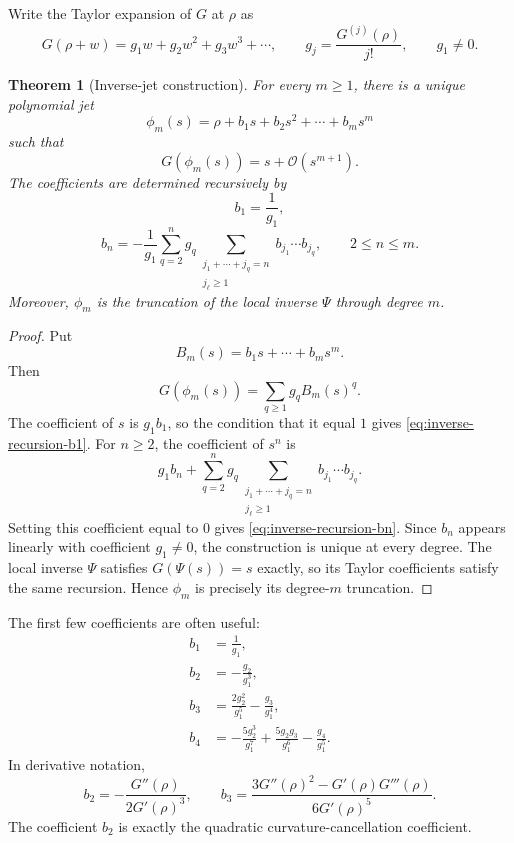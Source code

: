 \documentclass[11pt]{article}
\newtheorem{theorem}{Theorem}[section]
\theoremstyle{definition}
\newcommand{\Oterm}{\mathcal{O}}
\begin{document}
Write the Taylor expansion of $G$ at $\rho$ as
\begin{equation}\label{eq:G-taylor}
G(\rho+w)=g_1w+g_2w^2+g_3w^3+\cdots,
\qquad
g_j=\frac{G^{(j)}(\rho)}{j!},
\qquad g_1\neq0.
\end{equation}

\begin{theorem}[Inverse-jet construction]\label{thm:inverse-jet}
For every $m\geq1$, there is a unique polynomial jet
\begin{equation}\label{eq:phi-m-jet}
\phi_m(s)=\rho+b_1s+b_2s^2+\cdots+b_ms^m
\end{equation}
such that
\begin{equation}\label{eq:inverse-jet-flatness}
G(\phi_m(s))=s+\Oterm(s^{m+1}).
\end{equation}
The coefficients are determined recursively by
\begin{equation}\label{eq:inverse-recursion-b1}
b_1=\frac{1}{g_1},
\end{equation}
\begin{equation}\label{eq:inverse-recursion-bn}
b_n=-\frac{1}{g_1}
\sum_{q=2}^{n}g_q
\sum_{\substack{j_1+\cdots+j_q=n\\ j_\ell\geq1}}
b_{j_1}\cdots b_{j_q},
\qquad 2\leq n\leq m.
\end{equation}
Moreover, $\phi_m$ is the truncation of the local inverse $\Psi$ through degree $m$.
\end{theorem}

\begin{proof}
Put
\[
B_m(s)=b_1s+\cdots+b_ms^m.
\]
Then
\[
G(\phi_m(s))=\sum_{q\geq1}g_qB_m(s)^q.
\]
The coefficient of $s$ is $g_1b_1$, so the condition that it equal $1$ gives \eqref{eq:inverse-recursion-b1}. For $n\geq2$, the coefficient of $s^n$ is
\[
g_1b_n+
\sum_{q=2}^{n}g_q
\sum_{\substack{j_1+\cdots+j_q=n\\ j_\ell\geq1}}
b_{j_1}\cdots b_{j_q}.
\]
Setting this coefficient equal to $0$ gives \eqref{eq:inverse-recursion-bn}. Since $b_n$ appears linearly with coefficient $g_1\neq0$, the construction is unique at every degree. The local inverse $\Psi$ satisfies $G(\Psi(s))=s$ exactly, so its Taylor coefficients satisfy the same recursion. Hence $\phi_m$ is precisely its degree-$m$ truncation.
\end{proof}

The first few coefficients are often useful:
\begin{align}\label{eq:first-coefficients}
 b_1&=\frac{1}{g_1},\\
 b_2&=-\frac{g_2}{g_1^3},\\
 b_3&=\frac{2g_2^2}{g_1^5}-\frac{g_3}{g_1^4},\\
 b_4&=-\frac{5g_2^3}{g_1^7}+\frac{5g_2g_3}{g_1^6}-\frac{g_4}{g_1^5}.
\end{align}
In derivative notation,
\begin{equation}\label{eq:derivative-b2-b3}
 b_2=-\frac{G''(\rho)}{2G'(\rho)^3},
\qquad
 b_3=\frac{3G''(\rho)^2-G'(\rho)G'''(\rho)}{6G'(\rho)^5}.
\end{equation}
The coefficient $b_2$ is exactly the quadratic curvature-cancellation coefficient.
\end{document}
